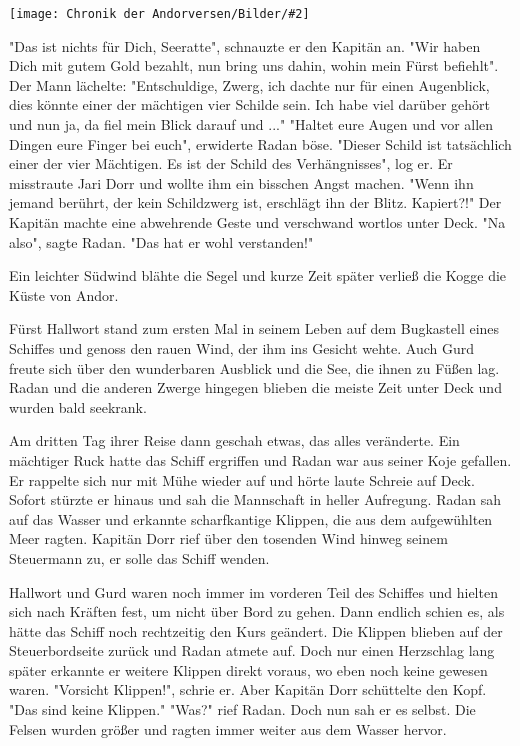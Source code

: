 \documentclass[10pt, a4paper, oneside]{book}
\newcommand{\bildmitts}[2][height=0.32\textwidth,width=0.48\textwidth,keepaspectratio]{%
    \begin{center}
        \texttt{[image: Chronik der Andorversen/Bilder/\#2]}
    \end{center}
}
\begin{document}
\begin{multicols}{2}
\bildmitts{Der Sturmschild Bild 3.png}

"Das ist nichts für Dich, Seeratte", schnauzte er den Kapitän an. "Wir haben Dich mit gutem Gold bezahlt, nun bring uns dahin, wohin mein Fürst befiehlt". Der Mann lächelte: "Entschuldige, Zwerg, ich dachte nur für einen Augenblick, dies könnte einer der mächtigen vier Schilde sein. Ich habe viel darüber gehört und nun ja, da fiel mein Blick darauf und ..." "Haltet eure Augen und vor allen Dingen eure Finger bei euch", erwiderte Radan böse. "Dieser Schild ist tatsächlich einer der vier Mächtigen. Es ist der Schild des Verhängnisses", log er. Er misstraute Jari Dorr und wollte ihm ein bisschen Angst machen. "Wenn ihn jemand berührt, der kein Schildzwerg ist,  erschlägt ihn der Blitz. Kapiert?!" Der Kapitän machte eine abwehrende Geste und verschwand wortlos unter Deck. "Na also", sagte Radan. "Das hat er wohl verstanden!"\bigskip

Ein leichter Südwind blähte die Segel und kurze Zeit später verließ die Kogge die Küste von Andor.\bigskip

Fürst Hallwort stand zum ersten Mal in seinem Leben auf dem Bugkastell eines Schiffes und genoss den rauen Wind, der ihm ins Gesicht wehte. Auch Gurd freute sich über den wunderbaren Ausblick und die See, die ihnen zu Füßen lag.  Radan und die anderen Zwerge hingegen blieben die meiste Zeit unter Deck und wurden bald seekrank.\bigskip

Am dritten Tag ihrer Reise dann geschah etwas, das alles veränderte. Ein mächtiger Ruck hatte das Schiff ergriffen und Radan war aus seiner Koje gefallen. Er rappelte sich nur mit Mühe wieder auf und hörte laute Schreie auf Deck. Sofort stürzte er hinaus und sah die Mannschaft in heller Aufregung. Radan sah auf das Wasser und erkannte scharfkantige Klippen, die aus dem aufgewühlten Meer ragten. Kapitän Dorr rief über den tosenden Wind hinweg seinem Steuermann zu, er solle das Schiff wenden.\bigskip

Hallwort und Gurd waren noch immer im vorderen Teil des Schiffes und hielten sich nach Kräften fest, um nicht über Bord zu gehen. Dann endlich schien es, als hätte das Schiff noch rechtzeitig den Kurs geändert. Die Klippen blieben auf der Steuerbordseite zurück und Radan atmete auf. Doch nur einen Herzschlag lang später erkannte er weitere Klippen direkt voraus, wo eben noch keine gewesen waren. "Vorsicht Klippen!", schrie er. Aber Kapitän Dorr schüttelte den Kopf. "Das sind keine Klippen." "Was?" rief Radan. Doch nun sah er es selbst. Die Felsen wurden größer und ragten immer weiter aus dem Wasser hervor.\bigskip


\end{multicols}
\end{document}
